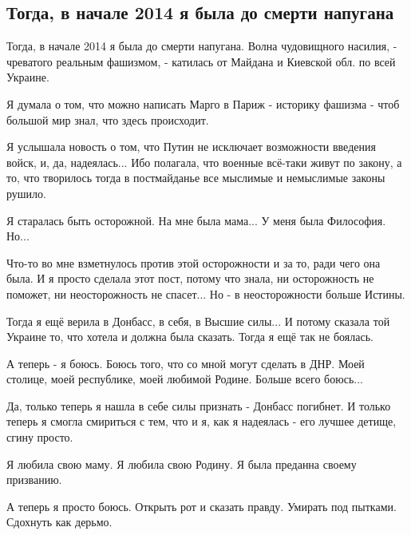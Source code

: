  
 
 
 
 
\subsection{Тогда, в начале 2014 я была до смерти напугана}

Тогда, в начале 2014 я была до смерти напугана. Волна чудовищного насилия, -
чреватого реальным фашизмом, - катилась от Майдана и Киевской обл. по всей
Украине.

Я думала о том, что можно написать Марго в Париж - историку фашизма - чтоб
большой мир знал, что здесь происходит.

Я услышала новость о том, что Путин не исключает возможности введения войск, и,
да, надеялась... Ибо полагала, что военные всё-таки живут по закону, а то, что
творилось тогда в постмайданье все мыслимые и немыслимые законы рушило.

Я старалась быть осторожной. На мне была мама... У меня была Философия. Но...

Что-то во мне взметнулось против этой осторожности и за то, ради чего она была.
И я просто сделала этот пост, потому что знала, ни осторожность не поможет, ни
неосторожность не спасет... Но - в неосторожности больше Истины.

Тогда я ещё верила в Донбасс, в себя, в Высшие силы... И потому сказала той
Украине то, что хотела и должна была сказать. Тогда я ещё так не боялась.

А теперь - я боюсь. Боюсь того, что со мной могут сделать в ДНР. Моей столице,
моей республике, моей любимой Родине. Больше всего боюсь...

Да, только теперь я нашла в себе силы признать - Донбасс погибнет. И только
теперь я смогла смириться с тем, что и я, как я надеялась - его лучшее детище,
сгину просто.

Я любила свою маму. Я любила свою Родину. Я была преданна своему призванию.

А теперь я просто боюсь. Открыть рот и сказать правду. Умирать под пытками. Сдохнуть как дерьмо.

